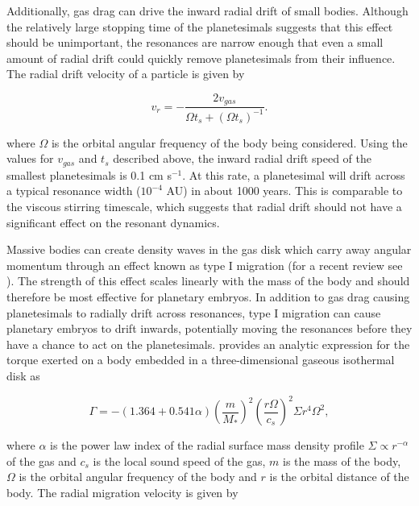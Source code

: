 Additionally, gas drag can drive the inward radial drift of small bodies. Although the relatively large stopping time of the 
planetesimals suggests that this effect should be unimportant, the resonances are narrow enough that even a small amount of 
radial drift could quickly remove planetesimals from their influence. The radial drift velocity of a particle is given by 
\cite{weidenschilling77}

\begin{equation}\label{eq:v_drift}
    v_{r}  = -\frac{2 v_{gas}}{\Omega t_{s} + \left( \Omega t_{s} \right)^{-1}}.
\end{equation}

\noindent where $\Omega$ is the orbital angular frequency of the body being considered. Using the values for $v_{gas}$ and 
$t_{s}$ described above, the inward radial drift speed of the smallest planetesimals is 0.1 cm s$^{-1}$. At this rate, a 
planetesimal will drift across a typical resonance width ($10^{-4}$ AU) in about 1000 years. This is comparable to the viscous 
stirring timescale, which suggests that radial drift should not have a significant effect on the resonant dynamics.

Massive bodies can create density waves in the gas disk which carry away angular momentum \cite{goldreich79, goldreich80} 
through an effect known as type I migration (for a recent review see \cite{baruteau14}). The strength of this effect scales linearly 
with the mass of the body and should therefore be most effective for planetary embryos. In addition to gas drag causing 
planetesimals to radially drift across resonances, type I migration can cause planetary embryos to drift inwards, potentially 
moving the resonances before they have a chance to act on the planetesimals. \cite{tanaka02} provides an analytic expression 
for the torque exerted on a body embedded in a three-dimensional gaseous isothermal disk as

\begin{equation}\label{eq:t1mig_torque}
     \Gamma = -\left( 1.364 + 0.541 \alpha \right) \left (\frac{m}{M_{*}} \right)^{2} \left( \frac{r \Omega}{c_{s}} \right)^{2} \Sigma r^{4} \Omega^{2},
\end{equation}

\noindent where $\alpha$ is the power law index of the radial surface mass density profile $\Sigma \propto r^{-\alpha}$ of the gas 
and $c_{s}$ is the local sound speed of the gas, $m$ is the mass of the body, $\Omega$ is the orbital angular frequency of the 
body and $r$ is the orbital distance of the body. The radial migration velocity is given by

